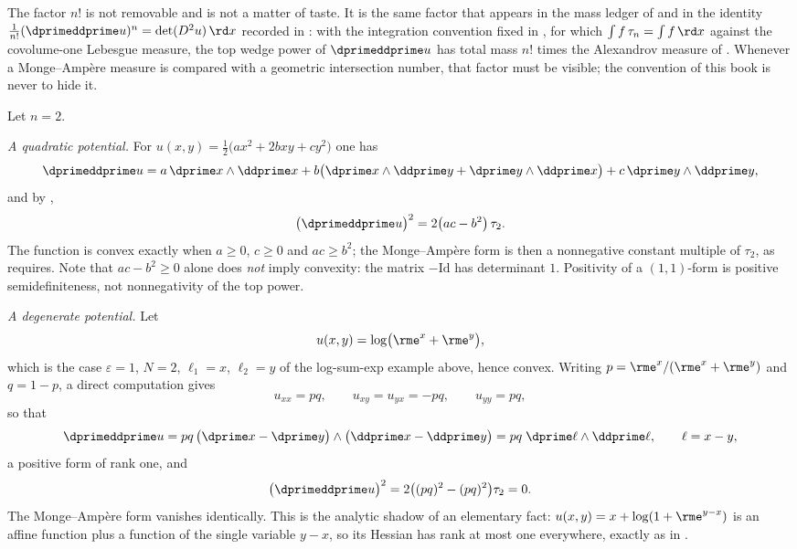 The factor $n!$ is not removable and is not a matter of taste.  It is the
same factor that appears in the mass ledger of
 and in the identity
$\tfrac1{n!}(\dprimeddprime u)^n=\det(D^2u)\,\rd x$ recorded in
: with the integration convention fixed in
, for which $\int f\,\tau_n=\int f\,\rd x$
against the covolume-one Lebesgue measure, the top wedge power of
$\dprimeddprime u$ has total mass $n!$ times the Alexandrov measure of
.  Whenever a Monge--Amp\`ere measure is
compared with a geometric intersection number, that factor must be visible;
the convention of this book is never to hide it.

\begin{example}
\label{ex:ch09-ma-plane}
Let $n=2$.

\emph{A quadratic potential.}  For
$u(x,y)=\tfrac12\bigl(ax^2+2bxy+cy^2\bigr)$ one has
\[
 \dprimeddprime u
 =a\,\dprime x\wedge\ddprime x
  +b\bigl(\dprime x\wedge\ddprime y+\dprime y\wedge\ddprime x\bigr)
  +c\,\dprime y\wedge\ddprime y,
\]
and by ,
\[
 \bigl(\dprimeddprime u\bigr)^2=2\bigl(ac-b^2\bigr)\,\tau_2 .
\]
The function is convex exactly when $a\geq0$, $c\geq0$ and $ac\geq b^2$; the
Monge--Amp\`ere form is then a nonnegative constant multiple of $\tau_2$, as
 requires.  Note that $ac-b^2\geq0$ alone does
\emph{not} imply convexity: the matrix $-\mathrm{Id}$ has determinant $1$.
Positivity of a $(1,1)$-form is positive semidefiniteness, not
nonnegativity of the top power.

\emph{A degenerate potential.}  Let
\[
 u(x,y)=\log\bigl(\rme^{x}+\rme^{y}\bigr),
\]
which is the case $\varepsilon=1$, $N=2$, $\ell_1=x$, $\ell_2=y$ of the
log-sum-exp example above, hence convex.  Writing
$p=\rme^{x}/(\rme^{x}+\rme^{y})$ and $q=1-p$, a direct computation gives
\[
 u_{xx}=pq,\qquad u_{xy}=u_{yx}=-pq,\qquad u_{yy}=pq,
\]
so that
\[
 \dprimeddprime u
 =pq\,\bigl(\dprime x-\dprime y\bigr)\wedge
        \bigl(\ddprime x-\ddprime y\bigr)
 =pq\;\dprime\ell\wedge\ddprime\ell,
 \qquad \ell=x-y,
\]
a positive form of rank one, and
\[
 \bigl(\dprimeddprime u\bigr)^2=2\bigl((pq)^2-(pq)^2\bigr)\tau_2=0 .
\]
The Monge--Amp\`ere form vanishes identically.  This is the analytic shadow of
an elementary fact: $u(x,y)=x+\log(1+\rme^{y-x})$ is an affine function plus a
function of the single variable $y-x$, so its Hessian has rank at most one
everywhere, exactly as in .


\end{example}
